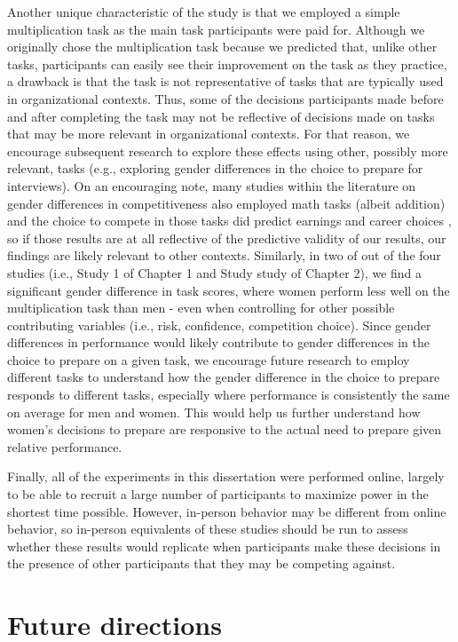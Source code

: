 \documentclass[a4paper, nobind]{templates/ociamthesis}
\begin{document}
Another unique characteristic of the study is that we employed a simple multiplication task as the main task participants were paid for. Although we originally chose the multiplication task because we predicted that, unlike other tasks, participants can easily see their improvement on the task as they practice, a drawback is that the task is not representative of tasks that are typically used in organizational contexts. Thus, some of the decisions participants made before and after completing the task may not be reflective of decisions made on tasks that may be more relevant in organizational contexts. For that reason, we encourage subsequent research to explore these effects using other, possibly more relevant, tasks (e.g., exploring gender differences in the choice to prepare for interviews). On an encouraging note, many studies within the literature on gender differences in competitiveness also employed math tasks (albeit addition) and the choice to compete in those tasks did predict earnings and career choices \autocite{Reuben2017,Buser2014}, so if those results are at all reflective of the predictive validity of our results, our findings are likely relevant to other contexts. Similarly, in two of out of the four studies (i.e., Study 1 of Chapter 1 and Study study of Chapter 2), we find a significant gender difference in task scores, where women perform less well on the multiplication task than men - even when controlling for other possible contributing variables (i.e., risk, confidence, competition choice). Since gender differences in performance would likely contribute to gender differences in the choice to prepare on a given task, we encourage future research to employ different tasks to understand how the gender difference in the choice to prepare responds to different tasks, especially where performance is consistently the same on average for men and women. This would help us further understand how women's decisions to prepare are responsive to the actual need to prepare given relative performance.

Finally, all of the experiments in this dissertation were performed online, largely to be able to recruit a large number of participants to maximize power in the shortest time possible. However, in-person behavior may be different from online behavior, so in-person equivalents of these studies should be run to assess whether these results would replicate when participants make these decisions in the presence of other participants that they may be competing against.

\hypertarget{future-directions}{%
\section{Future directions}\label{future-directions}}
\end{document}
